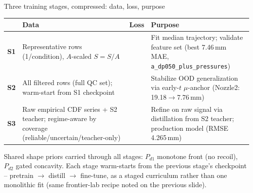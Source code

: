 \documentclass[aspectratio=169,11pt]{beamer}
\newcommand{\good}[1]{\textcolor{goodGreen}{#1}}
\begin{document}
\begin{frame}{Three training stages, compressed: data, loss, purpose}
\footnotesize
\renewcommand{\arraystretch}{1.5}
\begin{center}
\begin{tabular}{@{}C{0.7cm}L{3.3cm}L{5.0cm}L{3.6cm}@{}}
\toprule
& \textbf{Data} & \textbf{Loss} & \textbf{Purpose} \\
\midrule
\textbf{S1} &
Representative rows (1/condition), $A$-scaled $\hat S{=}S/A$ &
 &
Fit median trajectory; validate feature set (\good{best 7.46\,mm MAE}, \texttt{a\_dp050\_plus\_pressures}) \\
\midrule
\textbf{S2} &
All filtered rows (full QC set); warm-start from S1 checkpoint &
 &
Stabilize OOD generalization via early-$t$ $\mu$-anchor (\good{Nozzle2: 19.18$\to$7.76\,mm}) \\
\midrule
\textbf{S3} &
Raw empirical CDF series + S2 teacher; regime-aware by coverage (reliable/uncertain/teacher-only) &
 &
Refine on raw signal via distillation from S2 teacher; \good{production model (RMSE 4.265\,mm)} \\
\bottomrule
\end{tabular}
\end{center}

\vspace{0.4em}
{\scriptsize Shared shape priors carried through all stages: $P_{d1}$ monotone front (no recoil), $P_{d2}$ gated concavity. Each stage warm-starts from the previous stage's checkpoint -- pretrain $\to$ distill $\to$ fine-tune, as a staged curriculum rather than one monolithic fit (same frontier-lab recipe noted on the previous slide).}
\end{frame}
\end{document}
